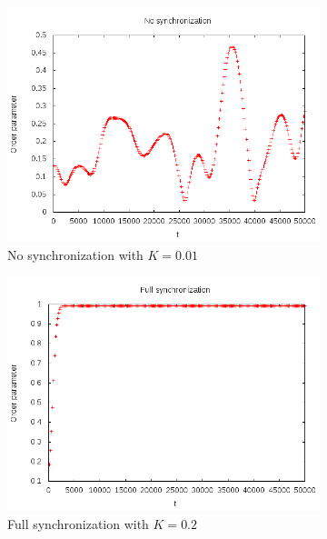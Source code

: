 \documentclass[12pt]{article}
\begin{document}
\begin{figure}
\centering
\begin{subfigure}[b]{0.4\textwidth}
\centering
\includegraphics[width=\textwidth]{data/strange}
\caption{No synchronization with $K=0.01$}
\label{fig:plot:nosynchro}
\end{subfigure}
\begin{subfigure}[b]{0.4\textwidth}
\centering
\includegraphics[width=\textwidth]{data/full}
\caption{Full synchronization with $K=0.2$}
\label{fig:plot:full}
\end{subfigure}
\begin{subfigure}[b]{0.4\textwidth}

\end{subfigure}
\end{figure}
\end{document}
